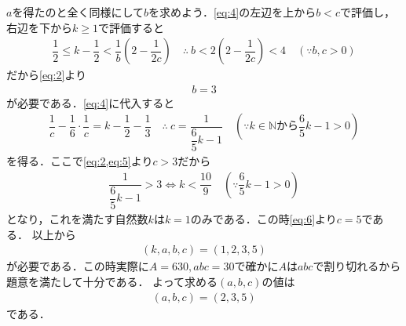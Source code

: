 \documentclass[../../main.tex]{subfiles}
\begin{document}
$a$を得たのと全く同様にして$b$を求めよう．\cref{eq:4}の左辺を上から$b<c$で評価し，右辺を下から$k\ge 1$で評価すると
\begin{align}
  \dfrac{1}{2}\le k-\dfrac{1}{2}<\dfrac{1}{b}\left(2-\dfrac{1}{2c}\right)
  \quad\therefore\
  b<2\left(2-\dfrac{1}{2c}\right)<4 \quad (\because b,c>0)
\end{align}
だから\cref{eq:2}より
\begin{align}
  b = 3 \label{eq:5}
\end{align}
が必要である．\cref{eq:4}に代入すると
\begin{align}
  \dfrac{1}{c}-\dfrac{1}{6}\cdot\dfrac{1}{c}=k-\dfrac{1}{2}-\dfrac{1}{3}
  \quad\therefore\
  c=\dfrac{1}{\dfrac{6}{5}k-1}
  \quad \left(\because k\in\mathbb{N}\text{から}\dfrac{6}{5}k-1>0\right) \label{eq:6}
\end{align}
を得る．ここで\cref{eq:2,eq:5}より$c>3$だから
\begin{align}
  \dfrac{1}{\dfrac{6}{5}k-1}>3 \iff k<\dfrac{10}{9} \quad \left(\because\dfrac{6}{5}k-1>0\right)
\end{align}
となり，これを満たす自然数$k$は$k=1$のみである．この時\cref{eq:6}より$c=5$である．
以上から
\begin{align}
  (k,a,b,c) = (1,2,3,5)
\end{align}
が必要である．この時実際に$A=630, abc = 30$で確かに$A$は$abc$で割り切れるから題意を満たして十分である．
よって求める$(a,b,c)$の値は
\begin{align}
  (a,b,c) = (2,3,5)
\end{align}
である．

\newpage
\end{document}
